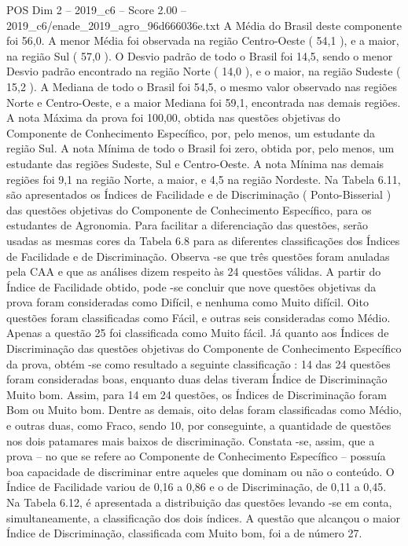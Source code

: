 \begin{textsample}{POS Dim 2 – 2019\_c6 – Score 2.00 – 2019\_c6/enade\_2019\_agro\_96d666036e.txt}
A Média do Brasil deste componente foi 56,0.
A menor Média foi observada na região Centro-Oeste ( 54,1 ), e a maior, na região Sul ( 57,0 ).
O Desvio padrão de todo o Brasil foi 14,5, sendo o menor Desvio padrão encontrado na região Norte ( 14,0 ), e o maior, na região Sudeste ( 15,2 ).
A Mediana de todo o Brasil foi 54,5, o mesmo valor observado nas regiões Norte e Centro-Oeste, e a maior Mediana foi 59,1, encontrada nas demais regiões.
A nota Máxima da prova foi 100,00, obtida nas questões objetivas do Componente de Conhecimento Específico, por, pelo menos, um estudante da região Sul.
A nota Mínima de todo o Brasil foi zero, obtida por, pelo menos, um estudante das regiões Sudeste, Sul e Centro-Oeste.
A nota Mínima nas demais regiões foi 9,1 na região Norte, a maior, e 4,5 na região Nordeste.
Na Tabela 6.11, são apresentados os Índices de Facilidade e de Discriminação ( Ponto-Bisserial ) das questões objetivas do Componente de Conhecimento Específico, para os estudantes de Agronomia.
Para facilitar a diferenciação das questões, serão usadas as mesmas cores da Tabela 6.8 para as diferentes classificações dos Índices de Facilidade e de Discriminação.
Observa -se que três questões foram anuladas pela CAA e que as análises dizem respeito às 24 questões válidas.
A partir do Índice de Facilidade obtido, pode -se concluir que nove questões objetivas da prova foram consideradas como Difícil, e nenhuma como Muito difícil.
Oito questões foram classificadas como Fácil, e outras seis consideradas como Médio.
Apenas a questão 25 foi classificada como Muito fácil.
Já quanto aos Índices de Discriminação das questões objetivas do Componente de Conhecimento Específico da prova, obtém -se como resultado a seguinte classificação : 14 das 24 questões foram consideradas boas, enquanto duas delas tiveram Índice de Discriminação Muito bom.
Assim, para 14 em 24 questões, os Índices de Discriminação foram Bom ou Muito bom.
Dentre as demais, oito delas foram classificadas como Médio, e outras duas, como Fraco, sendo 10, por conseguinte, a quantidade de questões nos dois patamares mais baixos de discriminação.
Constata -se, assim, que a prova – no que se refere ao Componente de Conhecimento Específico – possuía boa capacidade de discriminar entre aqueles que dominam ou não o conteúdo.
O Índice de Facilidade variou de 0,16 a 0,86 e o de Discriminação, de 0,11 a 0,45.
Na Tabela 6.12, é apresentada a distribuição das questões levando -se em conta, simultaneamente, a classificação dos dois índices.
A questão que alcançou o maior Índice de Discriminação, classificada com Muito bom, foi a de número 27.

\end{textsample}
